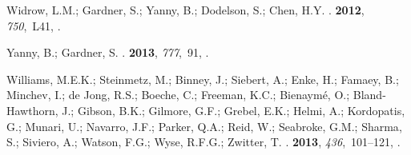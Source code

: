 \begin{thebibliography}{-------}
{Widrow}, L.M.; {Gardner}, S.; {Yanny}, B.; {Dodelson}, S.; {Chen}, H.Y.
.
 {\bf 2012}, {\em 750},~L41,
  \href{http://xxx.lanl.gov/abs/1203.6861}{{\normalfont [1203.6861]}}.

{Yanny}, B.; {Gardner}, S.
.
 {\bf 2013}, {\em 777},~91,
  \href{http://xxx.lanl.gov/abs/1309.2300}{{\normalfont [1309.2300]}}.

{Williams}, M.E.K.; {Steinmetz}, M.; {Binney}, J.; {Siebert}, A.; {Enke}, H.;
  {Famaey}, B.; {Minchev}, I.; {de Jong}, R.S.; {Boeche}, C.; {Freeman}, K.C.;
  {Bienaym{\'e}}, O.; {Bland-Hawthorn}, J.; {Gibson}, B.K.; {Gilmore}, G.F.;
  {Grebel}, E.K.; {Helmi}, A.; {Kordopatis}, G.; {Munari}, U.; {Navarro}, J.F.;
  {Parker}, Q.A.; {Reid}, W.; {Seabroke}, G.M.; {Sharma}, S.; {Siviero}, A.;
  {Watson}, F.G.; {Wyse}, R.F.G.; {Zwitter}, T.
.
 {\bf 2013}, {\em 436},~101--121,
  \href{http://xxx.lanl.gov/abs/1302.2468}{{\normalfont [1302.2468]}}.


\end{thebibliography}
